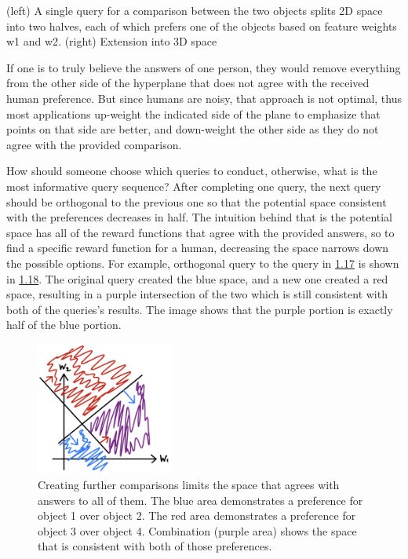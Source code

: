 \documentclass[
  letterpaper,
  DIV=11,
  numbers=noendperiod,
  oneside]{scrreprt}
\theoremstyle{remark}
\begin{document}
(left) A single query for a comparison between the two objects splits 2D
space into two halves, each of which prefers one of the objects based on
feature weights {w1} and {w2}. (right) Extension into 3D space

If one is to truly believe the answers of one person, they would remove
everything from the other side of the hyperplane that does not agree
with the received human preference. But since humans are noisy, that
approach is not optimal, thus most applications up-weight the indicated
side of the plane to emphasize that points on that side are better, and
down-weight the other side as they do not agree with the provided
comparison.

How should someone choose which queries to conduct, otherwise, what is
the most informative query sequence? After completing one query, the
next query should be orthogonal to the previous one so that the
potential space consistent with the preferences decreases in half. The
intuition behind that is the potential space has all of the reward
functions that agree with the provided answers, so to find a specific
reward function for a human, decreasing the space narrows down the
possible options. For example, orthogonal query to the query in
\hyperref[fig:2dcomp]{1.17} is shown in \hyperref[fig:2dspace]{1.18}.
The original query created the blue space, and a new one created a red
space, resulting in a purple intersection of the two which is still
consistent with both of the queries's results. The image shows that the
purple portion is exactly half of the blue portion.

\begin{figure}

{\centering \includegraphics[width=0.4\textwidth,height=\textheight]{Figures/2D-space.jpg}

}

\caption{Creating further comparisons limits the space that agrees with
answers to all of them. The blue area demonstrates a preference for
object 1 over object 2. The red area demonstrates a preference for
object 3 over object 4. Combination (purple area) shows the space that
is consistent with both of those preferences.}

\end{figure}%
\end{document}
